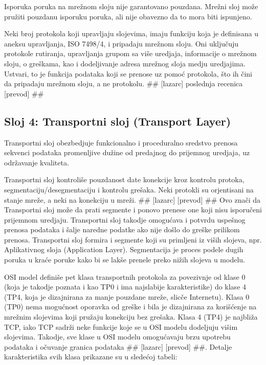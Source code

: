 \documentclass[a4paper,12pt, master]{etf}
\begin{document}
	Isporuka poruka na mre\v{z}nom sloju nije garantovano pouzdana. Mre\v{z}ni sloj mo\v{z}e pru\v{z}iti
	pouzdanu isporuku poruka, ali nije obavezno da to mora biti ispunjeno.

	Neki broj protokola koji upravljaju slojevima, imaju funkciju koja je definisana u aneksu
	upravljanja, ISO 7498/4, i pripadaju mre\v{z}nom sloju. Oni uklju\v{c}uju protokole rutiranja,
	upravljanja grupom sa vi\v{s}e uredjaja, informacije o mre\v{z}nom sloju, o gre\v{s}kama, kao i
	dodeljivanje adresa mre\v{z}nog sloja medju uredjajima. Ustvari, to je funkcija podataka koji
	se prenose uz pomo\'{c} protokola, \v{s}to ih \v{c}ini da pripadaju mre\v{z}nom sloju, a ne protokolu.
	\#\# [lazarc] poslednja	recenica [prevod] \#\#

	\subsection{Sloj 4: Transportni sloj (Transport Layer)}

	Transportni sloj obezbedjuje funkcionalno i proceduralno sredstvo prenosa sekvenci podataka
	promenljive du\v{z}ine od predajnog do prijemnog uredjaja, uz odr\v{z}avanje kvaliteta.

	Transportni sloj kontroli\v{s}e pouzdanost date konekcije kroz kontrolu protoka,
	segmentaciju/desegmentaciju i kontrolu gre\v{s}aka. Neki protokli su orjentisani na stanje
	mre\v{z}e, a neki na konekciju u mre\v{z}i. \#\# [lazarc] [prevod] \#\# Ovo zna\v{c}i da Transportni
	sloj mo\v{z}e da prati segmente i ponovo prenese one koji nisu isporu\v{c}eni prijemnom uredjaju.
	Transportni sloj takodje omogu\'{c}ava i potvrdu uspe\v{s}nog prenosa podataka i \v{s}alje naredne
	podatke ako nije do\v{s}lo do gre\v{s}ke prilikom prenosa. Transportni sloj formira i segmente
	koji su primljeni iz vi\v{s}ih slojeva, npr. Aplikativnog sloja (Application Layer).
	Segmentacija je proces podele dugih poruka u kra\'{c}e poruke kako bi se lak\v{s}e prenele preko
	ni\v{z}ih slojeva u modelu.

	OSI model defini\v{s}e pet klasa transportnih protokola za povezivnje od klase 0 (koja je
	takodje poznata i kao TP0 i ima najslabije karakteristike) do klase 4 (TP4, koja je
	dizajnirana za manje pouzdane mre\v{z}e, slic\v{c}e Internetu). Klasa 0 (TP0) nema mogu\'{c}nost
	oporavka od gre\v{s}ke i bila je dizajnirana za kori\v{s}\'{c}enje na mre\v{z}nim slojevima koji pru\v{z}aju
	konekciju bez gre\v{s}aka. Klasa 4 (TP4) je najbli\v{z}a TCP, iako TCP sadr\v{z}i neke funkcije koje
	se u OSI modelu dodeljuju vi\v{s}im slojevima. Takodje, sve klase u OSI modelu omogu\'{c}avaju
	brzu upotrebu podataka i o\v{c}uvanje granica podataka \#\# [lazarc] [prevod] \#\#. Detalje
	karakteristika svih klasa prikazane su u slede\'{c}oj tabeli:
\end{document}
